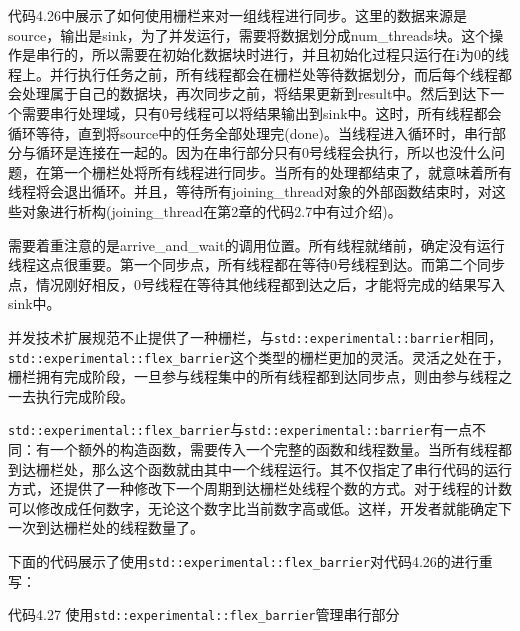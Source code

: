 代码4.26中展示了如何使用栅栏来对一组线程进行同步。这里的数据来源是source，输出是sink，为了并发运行，需要将数据划分成num\_threads块。这个操作是串行的，所以需要在初始化数据块时进行，并且初始化过程只运行在i为0的线程上。并行执行任务之前，所有线程都会在栅栏处等待数据划分，而后每个线程都会处理属于自己的数据块，再次同步之前，将结果更新到result中。然后到达下一个需要串行处理域，只有0号线程可以将结果输出到sink中。这时，所有线程都会循环等待，直到将source中的任务全部处理完(done)。当线程进入循环时，串行部分与循环是连接在一起的。因为在串行部分只有0号线程会执行，所以也没什么问题，在第一个栅栏处将所有线程进行同步。当所有的处理都结束了，就意味着所有线程将会退出循环。并且，等待所有joining\_thread对象的外部函数结束时，对这些对象进行析构(joining\_thread在第2章的代码2.7中有过介绍)。

需要着重注意的是arrive\_and\_wait的调用位置。所有线程就绪前，确定没有运行线程这点很重要。第一个同步点，所有线程都在等待0号线程到达。而第二个同步点，情况刚好相反，0号线程在等待其他线程都到达之后，才能将完成的结果写入sink中。

并发技术扩展规范不止提供了一种栅栏，与\texttt{std::experimental::barrier}相同，\texttt{std::experimental::flex\_barrier}这个类型的栅栏更加的灵活。灵活之处在于，栅栏拥有完成阶段，一旦参与线程集中的所有线程都到达同步点，则由参与线程之一去执行完成阶段。


\texttt{std::experimental::flex\_barrier}与\texttt{std::experimental::barrier}有一点不同：有一个额外的构造函数，需要传入一个完整的函数和线程数量。当所有线程都到达栅栏处，那么这个函数就由其中一个线程运行。其不仅指定了串行代码的运行方式，还提供了一种修改下一个周期到达栅栏处线程个数的方式。对于线程的计数可以修改成任何数字，无论这个数字比当前数字高或低。这样，开发者就能确定下一次到达栅栏处的线程数量了。

下面的代码展示了使用\texttt{std::experimental::flex\_barrier}对代码4.26的进行重写：

代码4.27 使用\texttt{std::experimental::flex\_barrier}管理串行部分


